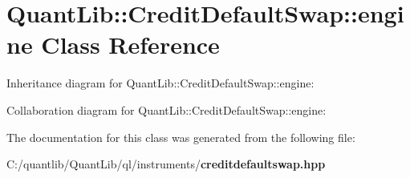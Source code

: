 \section{Quant\+Lib\+:\+:Credit\+Default\+Swap\+:\+:engine Class Reference}
\label{class_quant_lib_1_1_credit_default_swap_1_1engine}


Inheritance diagram for Quant\+Lib\+:\+:Credit\+Default\+Swap\+:\+:engine\+:


Collaboration diagram for Quant\+Lib\+:\+:Credit\+Default\+Swap\+:\+:engine\+:


The documentation for this class was generated from the following file\+:\begin{DoxyCompactItemize}
\item 
C\+:/quantlib/\+Quant\+Lib/ql/instruments/{\bf creditdefaultswap.\+hpp}\end{DoxyCompactItemize}
